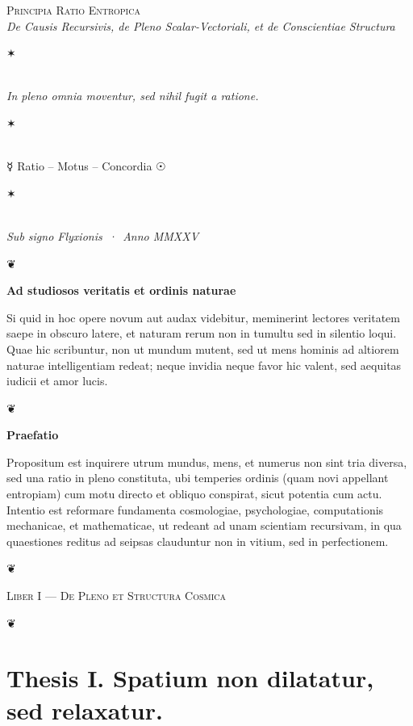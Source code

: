\documentclass[12pt]{article}
\newcommand{\florale}{\centerline{\large ❦}}
\newcommand{\aster}{\centerline{✶}}
\newcommand{\divider}{\vspace{1em}\florale\vspace{1em}}
\newcommand{\Liber}[1]{\vspace{1ex}\begin{center}\Large\textsc{Liber #1}\end{center}\vspace{-0.5ex}\florale\vspace{0.5ex}}
\begin{document}
\begin{center}
{\Large \textsc{Principia Ratio Entropica}}\\[0.5ex]
{\itshape De Causis Recursivis, de Pleno Scalar{-}Vectoriali, et de Conscientiae Structura}\\[1.25em]
\aster\\[0.5em]
{\itshape In pleno omnia moventur, sed nihil fugit a ratione.}\\[0.5em]
\aster\\[0.75em]
{\large ☿\; Ratio \;--\; Motus \;--\; Concordia \;☉}\\[0.75em]
\aster\\[0.25em]
{\itshape Sub signo Flyxionis \,·\, Anno MMXXV}
\end{center}

\divider

\begin{center}\textbf{Ad studiosos veritatis et ordinis naturae}\end{center}

Si quid in hoc opere novum aut audax videbitur, meminerint lectores veritatem saepe in obscuro latere, et naturam rerum non in tumultu sed in silentio loqui. Quae hic scribuntur, non ut mundum mutent, sed ut mens hominis ad altiorem naturae intelligentiam redeat; neque invidia neque favor hic valent, sed aequitas iudicii et amor lucis.

\divider

\begin{center}\textbf{Praefatio}\end{center}

Propositum est inquirere utrum mundus, mens, et numerus non sint tria diversa, sed una ratio in pleno constituta, ubi temperies ordinis (quam novi appellant entropiam) cum motu directo et obliquo conspirat, sicut potentia cum actu. Intentio est reformare fundamenta cosmologiae, psychologiae, computationis mechanicae, et mathematicae, ut redeant ad unam scientiam recursivam, in qua quaestiones reditus ad seipsas clauduntur non in vitium, sed in perfectionem.

\divider

\Liber{I — De Pleno et Structura Cosmica}

\section*{Thesis I. \; Spatium non dilatatur, sed relaxatur.}
\end{document}

